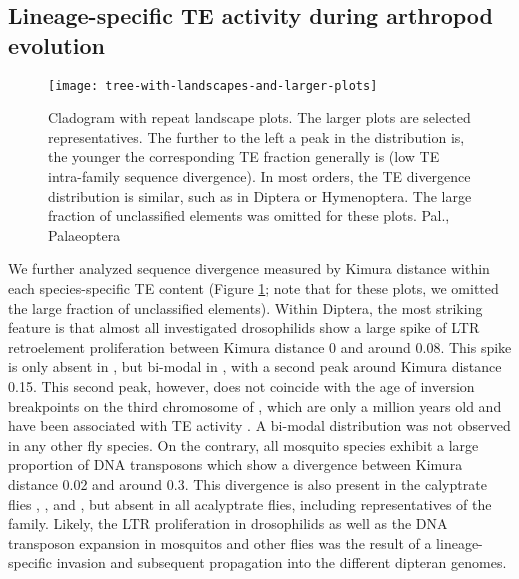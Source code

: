 \subsection{Lineage-specific TE activity during arthropod
evolution}\label{lineage-specific-te-activity-during-arthropod-evolution}

\begin{figure}[t]
\begin{center}
\texttt{[image: tree-with-landscapes-and-larger-plots]}
\caption[Arthropod repeat landscapes]{{Cladogram with repeat landscape
plots. The larger plots are selected representatives. The further to the
left a peak in the distribution is, the younger the corresponding TE
fraction generally is (low TE intra-family sequence divergence). In most
orders, the TE divergence distribution is similar, such as in Diptera or
Hymenoptera. The large fraction of unclassified elements was omitted for
these plots. Pal., Palaeoptera%
}}
\label{fig:landscapes}
\end{center}
\end{figure}

We further analyzed sequence divergence measured by Kimura distance
within each species-specific TE content (Figure \ref{fig:landscapes};
note that for these plots, we omitted the large fraction of unclassified
elements). Within Diptera, the most striking feature is that almost all
investigated drosophilids show a large spike of LTR retroelement
proliferation between Kimura distance 0 and around 0.08. This spike is
only absent in , but bi-modal in , with a second peak around Kimura distance 0.15. This
second peak, however, does not coincide with the age of inversion
breakpoints on the third chromosome of , which
are only a million years old and have been associated with TE activity
\citep{Wallace2011}. A bi-modal distribution was not observed in any
other fly species. On the contrary, all mosquito species exhibit a large
proportion of DNA transposons which show a divergence between Kimura
distance 0.02 and around 0.3. This divergence is also present in the
calyptrate flies , , and , but absent in all acalyptrate
flies, including representatives of the  family.
Likely, the LTR proliferation in drosophilids as well as the DNA
transposon expansion in mosquitos and other flies was the result of a
lineage-specific invasion and subsequent propagation into the different
dipteran genomes.



